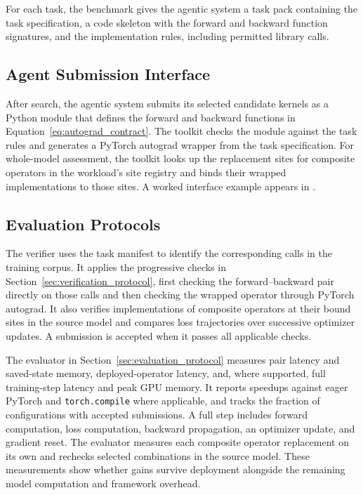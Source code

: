 For each task, the benchmark gives the agentic system a task pack containing the task specification, a code skeleton with the forward and backward function signatures, and the implementation rules, including permitted library calls.

\subsection{Agent Submission Interface}

After search, the agentic system submits its selected candidate kernels as a Python module that defines the forward and backward functions in Equation~\ref{eq:autograd_contract}. The toolkit checks the module against the task rules and generates a PyTorch autograd wrapper from the task specification. For whole-model assessment, the toolkit looks up the replacement sites for composite operators in the workload's site registry and binds their wrapped implementations to those sites. A worked interface example appears in .

\subsection{Evaluation Protocols}

The verifier uses the task manifest to identify the corresponding calls in the training corpus. It applies the progressive checks in Section~\ref{sec:verification_protocol}, first checking the forward--backward pair directly on those calls and then checking the wrapped operator through PyTorch autograd. It also verifies implementations of composite operators at their bound sites in the source model and compares loss trajectories over successive optimizer updates. A submission is accepted when it passes all applicable checks.

The evaluator in Section~\ref{sec:evaluation_protocol} measures pair latency and saved-state memory, deployed-operator latency, and, where supported, full training-step latency and peak GPU memory. It reports speedups against eager PyTorch and \texttt{torch.compile} where applicable, and tracks the fraction of configurations with accepted submissions. A full step includes forward computation, loss computation, backward propagation, an optimizer update, and gradient reset. The evaluator measures each composite operator replacement on its own and rechecks selected combinations in the source model. These measurements show whether gains survive deployment alongside the remaining model computation and framework overhead.
